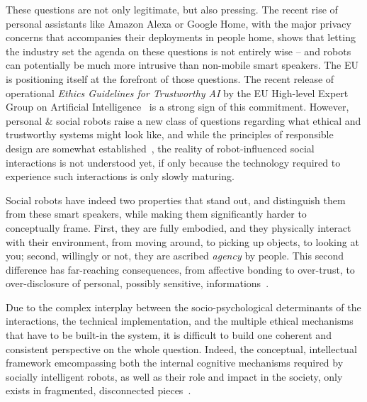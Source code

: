 \documentclass[11pt,a4paper]{report}
\begin{document}
These questions are not only legitimate, but also pressing. The recent rise of
personal assistants like Amazon Alexa or Google Home, with the major privacy
concerns that accompanies their deployments in people home, shows that letting
the industry set the agenda on these questions is not entirely wise -- and
robots can potentially be much more intrusive than non-mobile smart speakers.
The EU is positioning itself at the forefront of those questions. The recent
release of operational \emph{Ethics Guidelines for Trustworthy AI} by the EU
High-level Expert Group on Artificial Intelligence~\cite{eu2019ethics} is a
strong sign of this commitment.  However, personal \& social robots raise a new
class of questions regarding what ethical and trustworthy systems might look
like, and while the principles of responsible design are somewhat
established~\cite{stahl2016ethics, bsi2016robots}, the reality of
robot-influenced social interactions is not understood yet, if only because the
technology required to experience such interactions is only slowly maturing. 

Social robots have indeed two properties that stand out, and distinguish them from
these smart speakers, while making them significantly harder to conceptually frame.
First, they are fully embodied, and they physically interact with their
environment, from moving around, to picking up objects, to looking at you;
second, willingly or not, they are ascribed \emph{agency} by people. This second
difference has far-reaching consequences, from affective bonding to over-trust,
to over-disclosure of personal, possibly sensitive,
informations~\cite{martelaro2016tell,shiomi2017robot}.


Due to the complex interplay between the socio-psychological determinants of the
interactions, the technical implementation, and the multiple ethical mechanisms
that have to be built-in the system, it is difficult to build one coherent and
consistent perspective on the whole question. Indeed, the conceptual,
intellectual framework emcompassing both the internal cognitive mechanisms
required by socially intelligent robots, as well as their role and impact in the
society, only exists in fragmented, disconnected pieces~\cite{citeneeded}.
\end{document}
